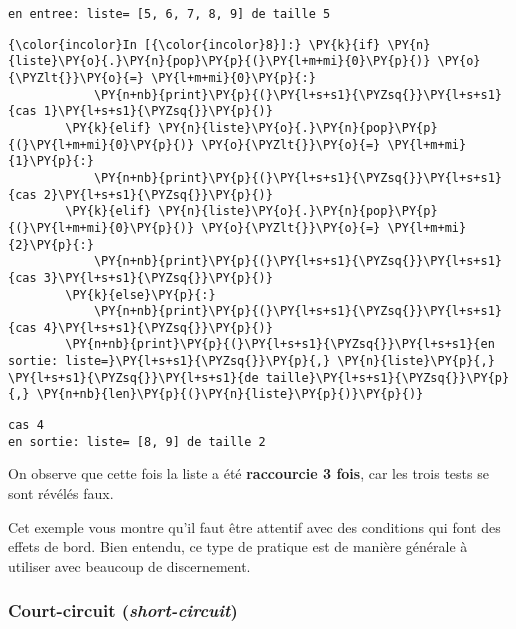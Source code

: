     \begin{Verbatim}[commandchars=\\\{\}]
en entree: liste= [5, 6, 7, 8, 9] de taille 5

    \end{Verbatim}

    \begin{Verbatim}[commandchars=\\\{\}]
{\color{incolor}In [{\color{incolor}8}]:} \PY{k}{if} \PY{n}{liste}\PY{o}{.}\PY{n}{pop}\PY{p}{(}\PY{l+m+mi}{0}\PY{p}{)} \PY{o}{\PYZlt{}}\PY{o}{=} \PY{l+m+mi}{0}\PY{p}{:}
            \PY{n+nb}{print}\PY{p}{(}\PY{l+s+s1}{\PYZsq{}}\PY{l+s+s1}{cas 1}\PY{l+s+s1}{\PYZsq{}}\PY{p}{)}
        \PY{k}{elif} \PY{n}{liste}\PY{o}{.}\PY{n}{pop}\PY{p}{(}\PY{l+m+mi}{0}\PY{p}{)} \PY{o}{\PYZlt{}}\PY{o}{=} \PY{l+m+mi}{1}\PY{p}{:}
            \PY{n+nb}{print}\PY{p}{(}\PY{l+s+s1}{\PYZsq{}}\PY{l+s+s1}{cas 2}\PY{l+s+s1}{\PYZsq{}}\PY{p}{)}
        \PY{k}{elif} \PY{n}{liste}\PY{o}{.}\PY{n}{pop}\PY{p}{(}\PY{l+m+mi}{0}\PY{p}{)} \PY{o}{\PYZlt{}}\PY{o}{=} \PY{l+m+mi}{2}\PY{p}{:}
            \PY{n+nb}{print}\PY{p}{(}\PY{l+s+s1}{\PYZsq{}}\PY{l+s+s1}{cas 3}\PY{l+s+s1}{\PYZsq{}}\PY{p}{)}
        \PY{k}{else}\PY{p}{:}
            \PY{n+nb}{print}\PY{p}{(}\PY{l+s+s1}{\PYZsq{}}\PY{l+s+s1}{cas 4}\PY{l+s+s1}{\PYZsq{}}\PY{p}{)}
        \PY{n+nb}{print}\PY{p}{(}\PY{l+s+s1}{\PYZsq{}}\PY{l+s+s1}{en sortie: liste=}\PY{l+s+s1}{\PYZsq{}}\PY{p}{,} \PY{n}{liste}\PY{p}{,} \PY{l+s+s1}{\PYZsq{}}\PY{l+s+s1}{de taille}\PY{l+s+s1}{\PYZsq{}}\PY{p}{,} \PY{n+nb}{len}\PY{p}{(}\PY{n}{liste}\PY{p}{)}\PY{p}{)}
\end{Verbatim}


    \begin{Verbatim}[commandchars=\\\{\}]
cas 4
en sortie: liste= [8, 9] de taille 2

    \end{Verbatim}

    On observe que cette fois la liste a été \textbf{raccourcie 3 fois}, car
les trois tests se sont révélés faux.

    Cet exemple vous montre qu'il faut être attentif avec des conditions qui
font des effets de bord. Bien entendu, ce type de pratique est de
manière générale à utiliser avec beaucoup de discernement.

    \hypertarget{court-circuit-short-circuit}{%
\subsubsection{\texorpdfstring{Court-circuit
(\emph{short-circuit})}{Court-circuit (short-circuit)}}\label{court-circuit-short-circuit}}

